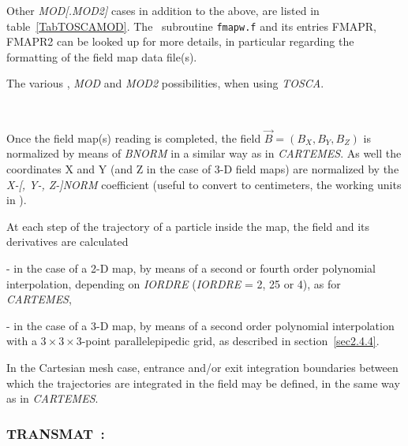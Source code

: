 {\medskip


\noindent Other \textsl{MOD[.MOD2]} cases  in addition to the above, are listed in  table~\ref{TabTOSCAMOD}. 
The \FORTRAN\  subroutine \texttt{fmapw.f} and its entries FMAPR, FMAPR2 can be looked up for more details, in particular 
regarding the  formatting of the field map data file(s). 



\begin{table}[p]

\caption{\label{TabTOSCAMOD}
The various \IZ, \textsl{MOD} and \textsl{MOD2} possibilities, when using \textsl{TOSCA}. 
}

~



\end{table}


\bigskip


\noindent Once the field map(s) reading is completed, the field $ \vec  B=(B_X,B_Y,B_Z) $ is normalized by means of 
\textsl{BNORM} in a similar way as in \textsl{CARTEMES}.  
 As well the  coordinates  X and Y (and Z in the case of 3-D field maps) are normalized by  the
  \textsl{X-[, Y-, Z-]NORM} coefficient (useful to convert to centimeters, the working units in  \zgoubi). 

\medskip

\noindent At each step of the trajectory of a particle inside the map, the
field and its derivatives are calculated 

 - in the case of a 2-D map,  by means of a second or fourth order polynomial interpolation, 
depending on \textsl{IORDRE} (\textsl{IORDRE} = 2, 25 or 4), as for 
\textsl{CARTEMES}, 

 - in the case of a 3-D map, by means of a second order polynomial interpolation with a 
$3  \times   3   \times   3$-point parallelepipedic grid, as described in 
section~\ref{sec2.4.4}. 


\medskip  

\noindent In the Cartesian mesh case, entrance and/or exit integration boundaries between which the trajectories
are integrated in the field may be defined, in the same way as in  \textsl{CARTEMES}. 





\newpage

\subsubsection*{TRANSMAT~:  \TRANSMATTitl}\label{TRANSMAT}
\medskip

}
